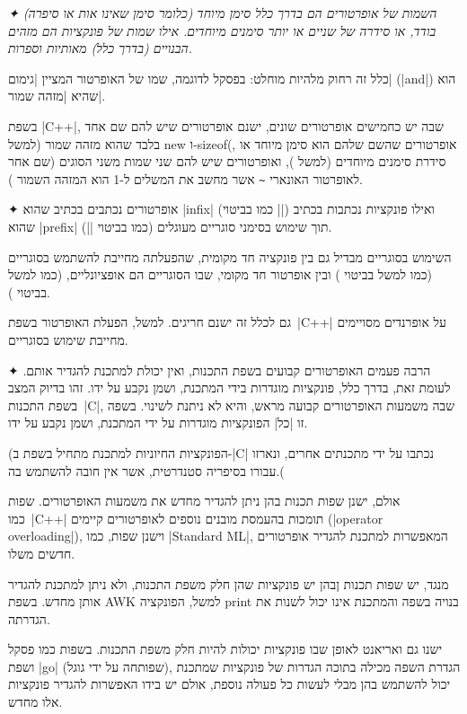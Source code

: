 \begin{enumerate}
\small\slshape
 ✦ השמות של אופרטורים הם בדרך כלל סימן מיוחד (כלומר סימן שאינו אות או סיפרה)
 בודד, או סידרה של שניים או יותר סימנים מיוחדים. אילו שמות של פונקציות הם
 מזהים הבנויים (בדרך כלל) מאותיות וספרות.

 כלל זה רחוק מלהיות מוחלט: בפסקל לדוגמה, שמו של האופרטור המציין \ע|גימום|
 (\E|and|) הוא  שהיא \ע|מזהה שמור|.

 בשפת \E|C++|, שבה יש כחמישים אופרטורים שונים, ישנם אופרטורים שיש להם שם אחד
 בלבד שהוא מזהה שמור (למשל new ו-sizeof(, אופרטורים שהשם שלהם הוא סימן
 מיוחד או סידרת סימנים מיוחדים (למשל \cc{<==>}), ואופרטורים שיש להם שני שמות
 משני הסוגים (שם אחר לאופרטור האונארי \lstinline{~} אשר מחשב את המשלים ל-1 הוא
 המזהה השמור ).

 ✦ אופרטורים נכתבים בכתיב שהוא \E|infix| (כמו בביטוי \E||) ואילו
 פונקציות נכתבות בכתיב שהוא \E|prefix| תוך שימוש בסימני סוגריים מעוגלים (כמו
 בביטוי \E||).

 השימוש בסוגריים מבדיל גם בין פונקציה חד מקומית, שהפעלתה מחייבת להשתמש
 בסוגריים (כמו למשל בביטוי ) ובין אופרטור חד מקומי, שבו הסוגריים
 הם אופציונליים, (כמו למשל בביטוי ).

גם לכלל זה ישנם חריגים. למשל, הפעלת האופרטור  בשפת~\E|C++| על
אופרנדים מסויימים מחייבת שימוש בסוגריים.

  ✦ הרבה פעמים האופרטורים קבועים בשפת התכנות, ואין יכולת למתכנת להגדיר אותם.
  לעומת זאת, בדרך כלל, פונקציות מוגדרות בידי המתכנת, ושמן נקבע על ידו. זהו
  בדיוק המצב בשפת התכנות~\E|C|, שבה משמעות האופרטורים קבועה מראש, והיא לא ניתנת
  לשינוי. בשפה זו \ע|כל| הפונקציות מוגדרות על ידי המתכנת, ושמן נקבע על ידו.

  (הפונקציות החיוניות למתכנת מתחיל בשפת ב-\E|C| נכתבו על ידי מתכנתים אחרים,
  ונארזו עבורו בסיפריה סטנדרטית, אשר אין חובה להשתמש בה.(

  אולם, ישנן שפות תכנות בהן ניתן להגדיר מחדש את משמעות האופרטורים. שפות
  כמו~\E|C++| תומכות בהעמסת מובנים נוספים לאופרטורים קיימים (\E|operator
  overloading|), וישנן שפות, כמו \E|Standard ML|, המאפשרות למתכנת להגדיר
  אופרטורים חדשים משלו.

  מנגד, יש שפות תכנות ןבהן יש פונקציות שהן חלק משפת התכנות, ולא ניתן למתכנת
  להגדיר אותן מחדש. בשפת AWK למשל, הפונקציה print בנויה בשפה והמתכנת אינו יכול
  לשנות את הגדרתה.

  ישנו גם ואריאנט לאופן שבו פונקציות יכולות להיות חלק משפת התכנות. בשפות כמו
  פסקל ושפת \E|go| (שפותחה על ידי גוגל), הגדרת השפה מכילה בתוכה הגדרות של
  פונקציות שמתכנת יכול להשתמש בהן מבלי לעשות כל פעולה נוספת, אולם יש בידו
  האפשרות להגדיר פונקציות אלו מחדש.
\end{enumerate}
